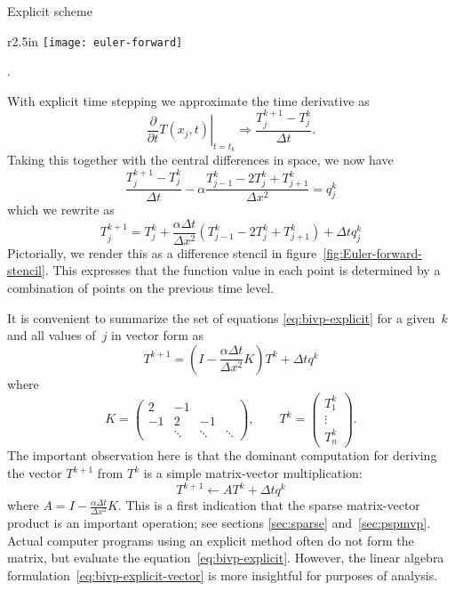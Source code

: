  {Explicit scheme}
\label{fig:explicit-heat}

\newcommand\dtdxx{\frac{\alpha\Delta t}{\Delta x^2}}

\begin{wrapfigure}{r}{2.5in}
  \leavevmode\kern\unitindent 
  \texttt{[image: euler-forward]}
  \caption{The difference stencil of the Euler forward method for the
    heat equation.}
  \label{fig:Euler-forward-stencil}.
\end{wrapfigure}
%
With explicit time stepping we approximate the time derivative as
\begin{equation}
  \left.\frac\partial{\partial t}T(x_j,t)\right|_{t=t_k}
  \Rightarrow
  \frac{T_j^{k+1}-T_j^k}{\Delta t}.
  \label{eq:disc-time-explicit}
\end{equation}
Taking this together with the central differences in space, we now have
\begin{equation}
  \frac{T_j^{k+1}-T_j^k}{\Delta t}-\alpha
  \frac{T_{j-1}^k-2T_j^k+T_{j+1}^k}{\Delta x^2}=q_j^k 
\end{equation}
which we rewrite as
\begin{equation}
  \label{eq:bivp-explicit}
  T_j^{k+1}=T_j^k+\dtdxx
  (T_{j-1}^k-2T_j^k+T_{j+1}^k)+\Delta t q_j^k 
\end{equation}
Pictorially, we render this as a difference stencil in
figure~\ref{fig:Euler-forward-stencil}.
This expresses that the function value in each point is determined by
a combination of points on the previous time level.

It is convenient to summarize the set of equations
\eqref{eq:bivp-explicit} for a given~$k$ and all values of~$j$
in vector form as
\begin{equation}
  \label{eq:bivp-explicit-vector}  
   T^{k+1}=\left(I-\dtdxx K\right)
   T^k+\Delta t q^k 
\end{equation}
where
\begin{equation}
  K=
  \begin{pmatrix}
    2&-1\\ -1&2&-1\\ &\ddots&\ddots&\ddots
  \end{pmatrix},\qquad
  T^k=
  \begin{pmatrix}
    T^k_1\\ \vdots \\ T^k_n
  \end{pmatrix}.
\end{equation}
The important observation here is that the dominant computation for
deriving the vector $T^{k+1}$ 
from $ T^k$ is a simple matrix-vector multiplication:
\begin{equation}
  T^{k+1}\leftarrow AT^k+\Delta tq^k
\end{equation}
where $A=I-\dtdxx K$. This is a first indication that the sparse
matrix-vector product is an important operation; see sections
\ref{sec:sparse} and~\ref{sec:pspmvp}.
Actual
computer programs using an explicit method often do not form the
matrix, but evaluate the equation~\eqref{eq:bivp-explicit}. However,
the linear algebra formulation~\eqref{eq:bivp-explicit-vector}
is more insightful for purposes of analysis.

